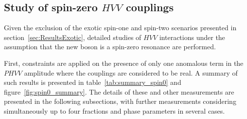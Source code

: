 \subsection{Study of spin-zero $HVV$ couplings} \label{sec:ResultsSpinZero}
Given the exclusion of the exotic spin-one and spin-two scenarios presented in section~\ref{sec:ResultsExotic},
detailed studies of $HVV$ interactions under the assumption that the new boson is a spin-zero
resonance are performed. 

First, constraints are applied on the presence of only one anomalous term in the $PHVV$
amplitude where the couplings are considered to be real. A summary of such results is presented
in table~\ref{tab:summary_spin0} and figure~\ref{fig:spin0_summary}.
The details of these and other measurements are presented in the following subsections, with further
measurements considering simultaneously up to four fractions and phase parameters in several cases.

